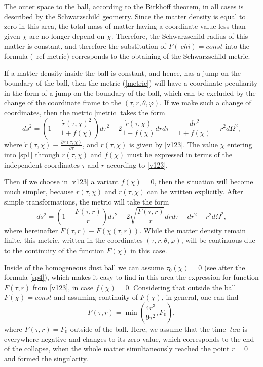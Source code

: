 \documentclass[12pt]{article}
\newcommand{\bq}{\begin{equation}}
\newcommand{\eq}{\end{equation}}
\begin{document}
The outer space to the ball, according to the Birkhoff theorem, in all cases is described by the Schwarzschild geometry.
Since the matter density is equal to zero in this area, the total mass of matter having a coordinate value less than given $\chi$ are no longer depend on $\chi$. Therefore, the Schwarzschild radius of this matter is constant, and therefore the substitution of $ F (\ chi) = const $ into the formula (\ ref {metric}) corresponds to the obtaining of the Schwarzschild metric.

If a matter density inside the ball is constant, and hence, has a jump on the boundary of the ball, then the metric (\ref{metric}) will have a coordinate peculiarity in the form of a jump on the boundary of the ball, which can be excluded by the change of the coordinate frame to the $(\tau, r, \theta, \varphi)$.
If we make such a change of coordinates, then the metric \eqref{metric} takes the form
\bq\label{sp1}
	d s^2 = \left( 1- \frac{\dot{r}(\tau, \chi)^2}{1+f(\chi)}\right) d \tau^2 + 2\frac{\dot{r}(\tau, \chi)}{1+f(\chi)}dr d\tau - \frac{dr^2}{1+f(\chi)} - r^2 d\Omega^2,
\eq
where $\dot{r}(\tau, \chi) \equiv \frac{\partial r(\tau, \chi)}{\partial \tau}$, and $r(\tau, \chi)$ is given by \eqref{v123}.
The value $\chi$ entering into \eqref{sp1} through $\dot{r}(\tau, \chi)$ and $f(\chi) $ must be expressed in terms of the independent coordinates $ \tau $ and $ r $ according to \eqref{v123}.

Then if we choose in \eqref{v123} a variant $f(\chi)=0$, then the situation will become much simpler, because $r(\tau, \chi)$ and $\dot{r}(\tau, \chi)$ can be written explicitly. After simple transformations, the metric will take the form
\bq
\label{metric2}
	d s^2 = \left(1-\frac{F(\tau, r)}{r} \right)d\tau^2 - 2 \sqrt{\frac{F(\tau, r)}{r}}dr d\tau  - dr^2 - r^2 d\Omega^2,
\eq
where hereinafter $F(\tau, r)\equiv F(\chi(\tau, r))$.
While the matter density remain finite, this metric, written in the coordinates $(\tau, r, \theta, \varphi)$, will be continuous due to the continuity of the function $F(\chi)$ in this case.

Inside of the homogeneous dust ball we can assume $\tau_0(\chi)=0$ (see after the formula \eqref{sp4}), which makes it easy to find in this area the expression for function $F(\tau, r)$ from \eqref{v123}, in case $f(\chi)=0$. Considering that outside the ball $F(\chi) = const$ and assuming continuity of $F(\chi)$, in general, one can find
\bq\label{sp2}
	F(\tau, r) = \min{ \left( \frac{4r^3}{9\tau^2}, F_0 \right) },
\eq
where $F(\tau, r)=F_0$ outside of the ball. Here, we assume that the time $ \ tau $ is everywhere negative and changes to its zero value, which corresponds to the end of the collapse, when the whole matter simultaneously reached the point $r=0$ and formed the singularity.
\end{document}
